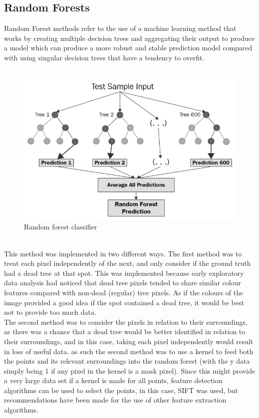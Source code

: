 \subsection{Random Forests}
Random Forest methods refer to the use of a machine learning method that works by creating multiple decision trees and aggregating their output to produce a model which can produce a more robust and stable prediction model compared with using singular decision trees that have a tendency to overfit.\\
\\
\begin{figure}[bht!]
    \centering
    \includegraphics[width=1\linewidth]{figs/random-forest.png}
    \caption{Random forest classifier}
    \label{fig:placeholder}
\end{figure}
\\
This method was implemented in two different ways. The first method was to treat each pixel independently of the next, and only consider if the ground truth had a dead tree at that spot. This was implemented because early exploratory data analysis had noticed that dead tree pixels tended to share similar colour features compared with non-dead (regular) tree pixels.  As if the colours of the image provided a good idea if the spot contained a dead tree, it would be best not to provide too much data.\\

The second method was to consider the pixels in relation to their surroundings, as there was a chance that a dead tree would be better identified in relation to their surroundings, and in this case, taking each pixel independently would result in loss of useful data. as such the second method was to use a kernel to feed both the points and its relevant surroundings into the random forest (with the y data simply being 1 if any pixel in the kernel is a mask pixel). Since this might provide a very large data set if a kernel is made for all points, feature detection algorithms can be used to select the points, in this case, SIFT was used, but recommendations have been made for the use of other feature extraction algorithms.

